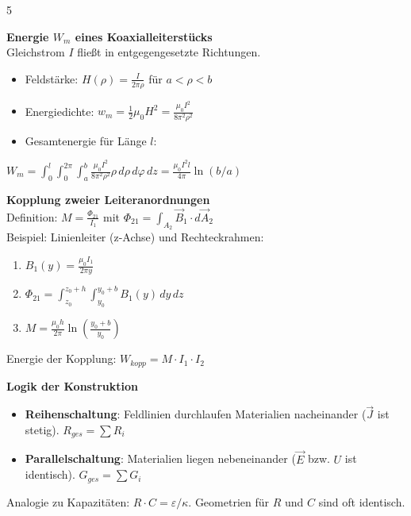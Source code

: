 \documentclass[a4paper, 2pt, landscape]{extarticle}
\begin{document}
\begin{multicols*}{5}
\begin{tcolorbox}[title={Magnetostatik: Magnetische Energie (Blatt 6)}, colback=white, colframe=black]
\textbf{Energie $W_m$ eines Koaxialleiterstücks} \\
Gleichstrom $I$ fließt in entgegengesetzte Richtungen.
\begin{itemize}
    \item Feldstärke: $H(\rho) = \frac{I}{2\pi\rho}$ für $a < \rho < b$
    \item Energiedichte: $w_m = \frac{1}{2} \mu_0 H^2 = \frac{\mu_0 I^2}{8\pi^2 \rho^2}$
    \item Gesamtenergie für Länge $l$:
\end{itemize}
$W_m = \int_0^l \int_0^{2\pi} \int_a^b \frac{\mu_0 I^2}{8\pi^2 \rho^2} \rho \, d\rho \, d\varphi \, dz = \frac{\mu_0 I^2 l}{4\pi} \ln(b/a)$
\end{tcolorbox}

\begin{tcolorbox}[title={Induktion: Gegeninduktivität $M$ (Blatt 7/8)}, colback=white, colframe=black]
\textbf{Kopplung zweier Leiteranordnungen} \\
Definition: $M = \frac{\Phi_{21}}{I_1}$ mit $\Phi_{21} = \int_{A_2} \vec{B}_1 \cdot d\vec{A}_2$ \\
Beispiel: Linienleiter (z-Achse) und Rechteckrahmen:
\begin{enumerate}
    \item $B_1(y) = \frac{\mu_0 I_1}{2\pi y}$
    \item $\Phi_{21} = \int_{z_0}^{z_0+h} \int_{y_0}^{y_0+b} B_1(y) \, dy \, dz$
    \item $M = \frac{\mu_0 h}{2\pi} \ln\left(\frac{y_0+b}{y_0}\right)$
\end{enumerate}
Energie der Kopplung: $W_{kopp} = M \cdot I_1 \cdot I_2$
\end{tcolorbox}

\begin{tcolorbox}[title={Strömungsfeld: Ersatzschaltbilder (Blatt 5)}, colback=white, colframe=black]
\textbf{Logik der Konstruktion}
\begin{itemize}
    \item \textbf{Reihenschaltung}: Feldlinien durchlaufen Materialien nacheinander ($\vec{J}$ ist stetig). $R_{ges} = \sum R_i$
    \item \textbf{Parallelschaltung}: Materialien liegen nebeneinander ($\vec{E}$ bzw. $U$ ist identisch). $G_{ges} = \sum G_i$
\end{itemize}
Analogie zu Kapazitäten: $R \cdot C = \varepsilon / \kappa$. Geometrien für $R$ und $C$ sind oft identisch.
\end{tcolorbox}


\end{multicols*}
\end{document}

